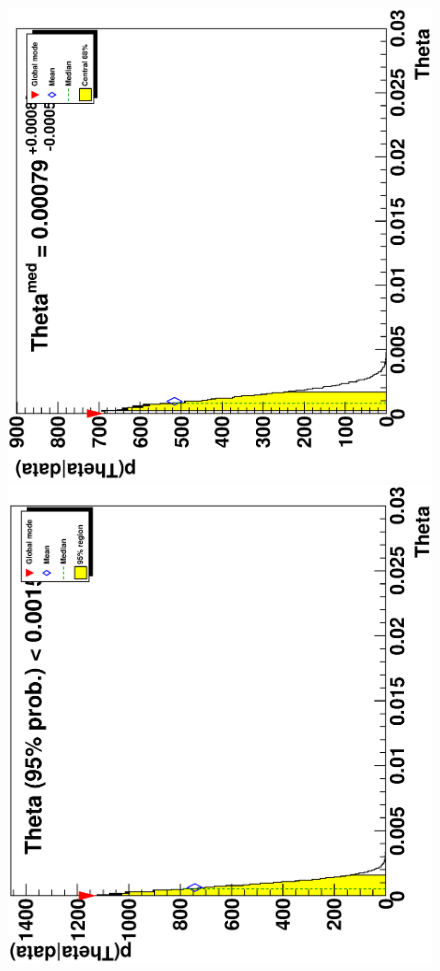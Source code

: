     \begin{figure}[h]
        \begin{center}
            \includegraphics[scale=0.35,natwidth=610,natheight=642,angle=-90]{images/ee__LL_minus_L2/post.ps}
            \includegraphics[scale=0.35,natwidth=610,natheight=642,angle=-90]{images/ee__LR_minus_L2/post.ps}

\end{center}
\end{figure}
